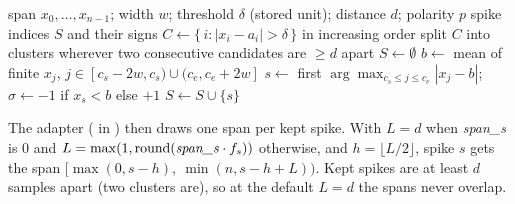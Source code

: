 \begin{algorithm}[H]
\caption{Spike detection (v1)}
\begin{algorithmic}[1]
\Require span $x_0,\dots,x_{n-1}$; width $w$; threshold $\delta$ (stored unit); distance $d$; polarity $p$
\Ensure spike indices $S$ and their signs
\State $C \gets \{\, i : |x_i - a_i| > \delta \,\}$ in increasing order 
\State split $C$ into clusters wherever two consecutive candidates are $\geq d$ apart
\State $S \gets \emptyset$
  \State $b \gets$ mean of finite $x_j$, $j \in [c_s - 2w, c_s) \cup (c_e, c_e + 2w]$
  \State $s \gets$ first $\arg\max_{c_s \le j \le c_e} |x_j - b|$; \quad $\sigma \gets -1$ if $x_s < b$ else $+1$
    \State $S \gets S \cup \{s\}$
  \EndIf
\EndFor
\end{algorithmic}
\end{algorithm}

The adapter ( in ) then draws one span per
kept spike. With $L = d$ when \emph{span\_s} is 0 and $L = \max(1, \operatorname{round}(
\text{\emph{span\_s}} \cdot f_s))$ otherwise, and $h = \lfloor L/2 \rfloor$, spike $s$ gets
the span $[\max(0, s-h),\ \min(n, s-h+L))$. Kept spikes are at least $d$ samples apart (two
clusters are), so at the default $L = d$ the spans never overlap.

